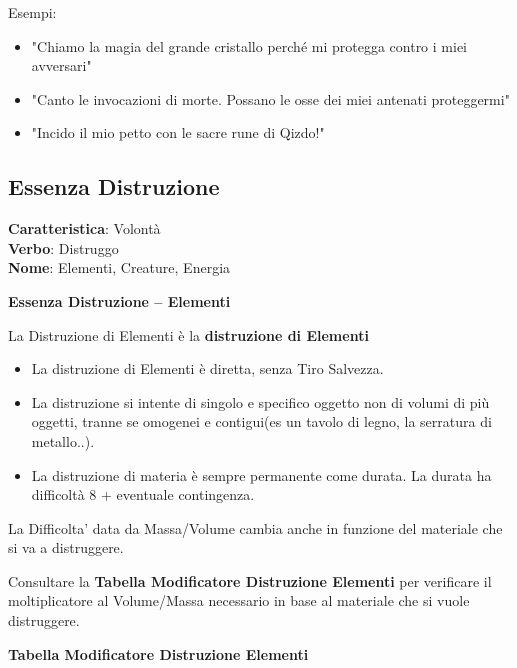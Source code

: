 \documentclass[a4paper,11pt,twoside,openany]{book}
\begin{document}
\bigskip

Esempi:
\begin{itemize}
	\item
	      "Chiamo la magia del grande cristallo perché mi protegga contro i miei avversari"
	\item
	      "Canto le invocazioni di morte. Possano le osse dei miei antenati proteggermi"
	\item
	      "Incido il mio petto con le sacre rune di Qizdo!"
\end{itemize}

\pagebreak

\subsection{Essenza Distruzione}

\textbf{Caratteristica}: Volontà\\
\textbf{Verbo}: Distruggo\\
\textbf{Nome}: Elementi, Creature, Energia\\

\label{essenza-distruzione---volonta}

\textbf{Essenza Distruzione -- Elementi}

La Distruzione di Elementi è la \textbf{distruzione di Elementi}
\begin{itemize}
	\item
	      La distruzione di Elementi è diretta, senza Tiro Salvezza.
	\item
	      La distruzione si intente di singolo e specifico oggetto non di volumi di più oggetti, tranne se omogenei e contigui(es un tavolo di legno, la serratura di metallo..).
	\item
	      La distruzione di materia è sempre permanente come durata. La durata ha difficoltà 8 + eventuale contingenza.
\end{itemize}

\bigskip

La Difficolta' data da Massa/Volume cambia anche in funzione del materiale che si va a distruggere.

\bigskip

Consultare la \textbf{Tabella Modificatore Distruzione Elementi} per verificare il moltiplicatore al Volume/Massa necessario in base al materiale che si vuole distruggere.

\bigskip

\textbf{Tabella Modificatore Distruzione Elementi}
\end{document}
